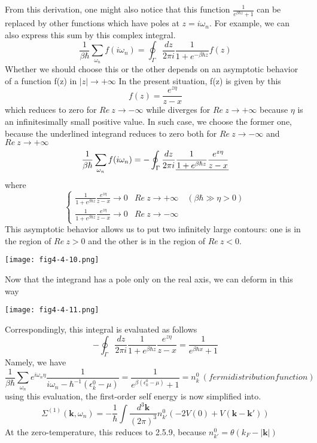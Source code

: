 From this derivation, one might also notice that this function $\frac{1}{e^{\beta\hbar z}+1}$ can be replaced by other functions which have poles at $z=i\omega_n$.
For example, we can also express this sum by this complex integral.
\[
\frac{1}{\beta\hbar}\sum_{\omega_n}f(i\omega_n)=\oint_\Gamma \frac{dz}{2\pi i} \frac{1}{1+e^{-\beta\hbar z}}f(z) \tag{$4.4.22^\prime$}
\]
Whether we should choose this or the other depends on an asymptotic behavior of a function f(z) in $|z|\rightarrow+\infty$
In the present situation, f(z) is given by this
\[
f(z)=\frac{e^{z\eta}}{z-x}
\]
which reduces to zero for $Re\ z\rightarrow-\infty$ while diverges for $Re\ z\rightarrow+\infty$ because $\eta$ is an infinitesimally small positive value.
In such case, we choose the former one, because the underlined integrand reduces to zero both for $Re\ z\rightarrow-\infty$ and $Re\ z\rightarrow+\infty$
\[
\frac{1}{\beta\hbar}\sum_{\omega_n}f(i\omega_n)=-\oint_\Gamma\frac{dz}{2\pi i} \uline{\frac{1}{1+e^{\beta\hbar z}}\frac{e^{z\eta}}{z-x}}
\]
where
\[
\begin{cases}
\frac{1}{1+e^{\beta\hbar z}}\frac{e^{z\eta}}{z-x}\rightarrow 0 & Re\ z\rightarrow+\infty\quad(\beta\hbar\gg\eta> 0)\\
\frac{1}{1+e^{\beta\hbar z}}\frac{e^{z\eta}}{z-x}\rightarrow 0 & Re\ z\rightarrow-\infty
\end{cases}
\]
This asymptotic behavior allows us to put two infinitely large contours: one is in the region of $Re\ z> 0$ and the other is in the region of $Re\ z< 0$.
\begin{center}
\texttt{[image: fig4-4-10.png]}
\end{center}
Now that the integrand has a pole only on the real axis, we can deform in this way
\begin{center}
\texttt{[image: fig4-4-11.png]}
\end{center}
Correspondingly, this integral is evaluated as follows
\begin{equation}
-\oint_\Gamma\frac{dz}{2\pi i} \frac{1}{1+e^{\beta\hbar z}}\frac{e^{z\eta}}{z-x}=\frac{1}{e^{\beta\hbar x}+1}
\end{equation}
Namely, we have
\[
\frac{1}{\beta\hbar}\sum_{\omega_n} e^{i\omega_n\eta} \frac{1}{i\omega_n-\hbar^{-1}(\epsilon_k^0-\mu)}=\frac{1}{e^{\beta(\epsilon_k^0-\mu)}+1}=n_k^0\ (fermi distribution function) \tag{$4.4.23^\prime$}
\]
using this evaluation, the first-order self energy is now simplified into.
\begin{equation}
\Sigma^{(1)} (\mathbf{k},\omega_n)=-\frac{1}{\hbar} \int \frac{d^3\mathbf{k}}{(2\pi)^3} n_{k'}^0 \left(-2V(0)+V(\mathbf{k}-\mathbf{k}')\right)
\end{equation}
At the zero-temperature, this reduces to 2.5.9, because $n_{k'}^0=\theta(k_F-|\mathbf{k}|)$

